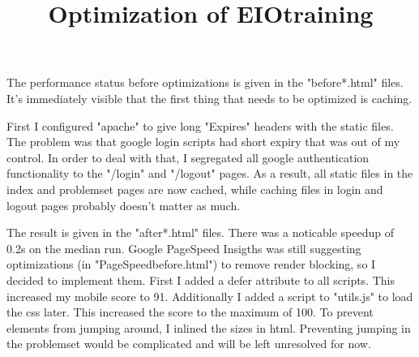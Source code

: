 \documentclass{article}
\begin{document}
\title{Optimization of EIOtraining}
\maketitle

The performance status before optimizations is given in the "before*.html" files. It's immediately visible that the first thing that needs to be optimized is caching.

First I configured "apache" to give long "Expires" headers with the static files. The problem was that google login scripts had short expiry that was out of my control. In order to deal with that, I segregated all google authentication functionality to the "/login" and "/logout" pages. As a result, all static files in the index and problemset pages are now cached, while caching files in login and logout pages probably doesn't matter as much.

The result is given in the "after*.html" files. There was a noticable speedup of 0.2s on the median run. Google PageSpeed Insigths was still suggesting optimizations (in "PageSpeedbefore.html") to remove render blocking, so I decided to implement them. First I added a defer attribute to all scripts. This increased my mobile score to 91. Additionally I added a script to "utils.js" to load the css later. This increased the score to the maximum of 100. To prevent elements from jumping around, I inlined the sizes in html. Preventing jumping in the problemset would be complicated and will be left unresolved for now.
\end{document}

